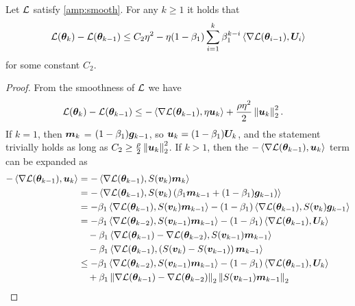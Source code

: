 \begin{lemma}\label{descent-lemma}
    Let $\mathcal{L}$ satisfy \cref{amp:smooth}. For any $k \geq 1$ it holds that \begin{align*}
        \mathcal{L}({\bm{\theta}}_{k}) - \mathcal{L}({\bm{\theta}}_{k-1}) \leq C_2 \eta^2 -\eta (1-\beta_1)\sum_{i=1}^{k} \beta_1^{k-i}\left\langle \nabla\mathcal{L}({\bm{\theta}}_{i-1}), {\bm{U}}_i \right\rangle
    \end{align*}
    for some constant $C_2$.
\end{lemma}
\begin{proof}
    From the smoothness of $\mathcal{L}$ we have \begin{align*}
        \mathcal{L}({\bm{\theta}}_{k}) - \mathcal{L}({\bm{\theta}}_{k-1}) & \leq - \left\langle \nabla \mathcal{L}({\bm{\theta}}_{k-1}), \eta {\bm{u}}_k \right\rangle + \frac{\rho\eta^2}{2} \left\|{\bm{u}}_k\right\|_2^2.
    \end{align*}   
    If $k = 1$, then ${\bm{m}}_k$ = $(1-\beta_1){\bm{g}}_{k-1}$, so ${\bm{u}}_k = (1-\beta_1){\bm{U}}_{k}$, and the statement trivially holds as long as $C_2 \geq \frac{\rho}{2}\left\|{\bm{u}}_k\right\|_2^2$. If $k > 1$, then the $- \left\langle \nabla \mathcal{L}({\bm{\theta}}_{k-1}), {\bm{u}}_k \right\rangle$ term can be expanded as \begin{align*}
        - \left\langle \nabla \cL(\vtheta_{k-1}), \vu_k \right\rangle &= - \left\langle \nabla \cL(\vtheta_{k-1}), S(\vv_k)\vm_k \right\rangle \\
        &=- \left\langle \nabla \cL(\vtheta_{k-1}), S(\vv_k)\left(\beta_1 \vm_{k-1} + (1-\beta_1)\vg_{k-1}\right) \right\rangle \\
        &=- \beta_1\left\langle \nabla \cL(\vtheta_{k-1}), S(\vv_k)\vm_{k-1}\right\rangle - (1-\beta_1)\left\langle \nabla \cL(\vtheta_{k-1}),S(\vv_k)\vg_{k-1}\right\rangle \\
        &=- \beta_1\left\langle \nabla \cL(\vtheta_{k-2}), S(\vv_{k-1})\vm_{k-1}\right\rangle - (1-\beta_1)\left\langle \nabla \cL(\vtheta_{k-1}),\mU_k\right\rangle \\
        &\quad - \beta_1 \left\langle \nabla\cL(\vtheta_{k-1})-\nabla\cL(\vtheta_{k-2}),S(\vv_{k-1})\vm_{k-1}\right\rangle \\
        &\quad - \beta_1 \left\langle \nabla\cL(\vtheta_{k-1}),\left(S(\vv_{k})-S(\vv_{k-1})\right)\vm_{k-1}\right\rangle \\
        &\leq - \beta_1\left\langle \nabla \cL(\vtheta_{k-2}), S(\vv_{k-1})\vm_{k-1}\right\rangle - (1-\beta_1)\left\langle \nabla \cL(\vtheta_{k-1}),\mU_k\right\rangle \\
        &\quad + \beta_1 \lnormtwo{\nabla\cL(\vtheta_{k-1})-\nabla\cL(\vtheta_{k-2})}\lnormtwo{S(\vv_{k-1})\vm_{k-1}} \\

\end{align*}
\end{proof}
